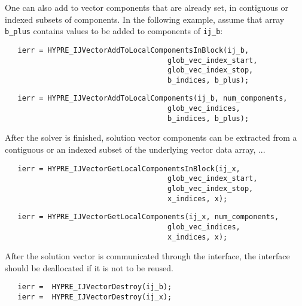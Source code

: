One can also add to vector components that are already set, in
contiguous or indexed subsets of components.
In the following example,
assume that array \verb+b_plus+
contains values to be added to components of \verb+ij_b+:

\begin{verbatim}
   ierr = HYPRE_IJVectorAddToLocalComponentsInBlock(ij_b,
                                      glob_vec_index_start,
                                      glob_vec_index_stop,
                                      b_indices, b_plus); 
\end{verbatim}
\begin{verbatim}
   ierr = HYPRE_IJVectorAddToLocalComponents(ij_b, num_components,
                                      glob_vec_indices,
                                      b_indices, b_plus);
\end{verbatim}

\noindent After the solver is finished, solution vector components
can be extracted from a contiguous or an indexed subset of
the underlying vector data array, ...

\begin{verbatim}
   ierr = HYPRE_IJVectorGetLocalComponentsInBlock(ij_x,
                                      glob_vec_index_start,
                                      glob_vec_index_stop,
                                      x_indices, x);
\end{verbatim}
\begin{verbatim}
   ierr = HYPRE_IJVectorGetLocalComponents(ij_x, num_components,
                                      glob_vec_indices,
                                      x_indices, x);
\end{verbatim}

\noindent After the solution vector is communicated through the interface,
the interface should be deallocated if it is not to be reused.

\begin{verbatim}
   ierr =  HYPRE_IJVectorDestroy(ij_b);
   ierr =  HYPRE_IJVectorDestroy(ij_x);
\end{verbatim}



